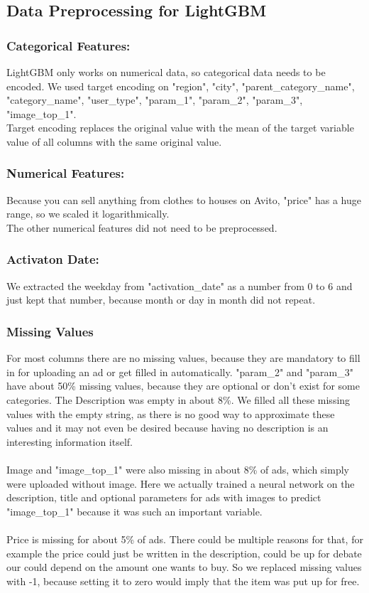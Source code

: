 \documentclass[runningheads]{llncs}
\begin{document}
\subsection{Data Preprocessing for LightGBM}
\subsubsection{Categorical Features:}
LightGBM only works on numerical data, so categorical data needs to be encoded. We used target encoding on "region", "city", "parent\_category\_name", "category\_name", "user\_type", "param\_1", "param\_2", "param\_3", "image\_top\_1".\\
Target encoding replaces the original value with the mean of the target variable value of all columns with the same original value.
\subsubsection{Numerical Features:}
Because you can sell anything from clothes to houses on Avito, "price" has a huge range, so we scaled it logarithmically.\\
The other numerical features did not need to be preprocessed.
\subsubsection{Activaton Date:} 
We extracted the weekday from "activation\_date" as a number from 0 to 6 and just kept that number, because month or day in month did not repeat.

\subsubsection{Missing Values}
 For most columns there are no missing values, because they are mandatory to fill in for uploading an ad or get filled in automatically. "param\_2" and "param\_3" have about 50\% missing values, because they are optional or don't exist for some categories. The Description was empty in about 8\%. We filled all these missing values with the empty string, as there is no good way to approximate these values and it may not even be desired because having no description is an interesting information itself.\\ \\
 Image and "image\_top\_1" were also missing in about 8\% of ads, which simply were uploaded without image. Here we actually trained a neural network on the description, title and optional parameters for ads with images to predict "image\_top\_1" because it was such an important variable.\\ \\
 Price is missing for about 5\%  of ads. There could be multiple reasons for that, for example the price could just be written in the description, could be up for debate our could depend on the amount one wants to buy. So we replaced missing values with -1, because setting it to zero would imply that the item was put up for free.
 
\end{document}
